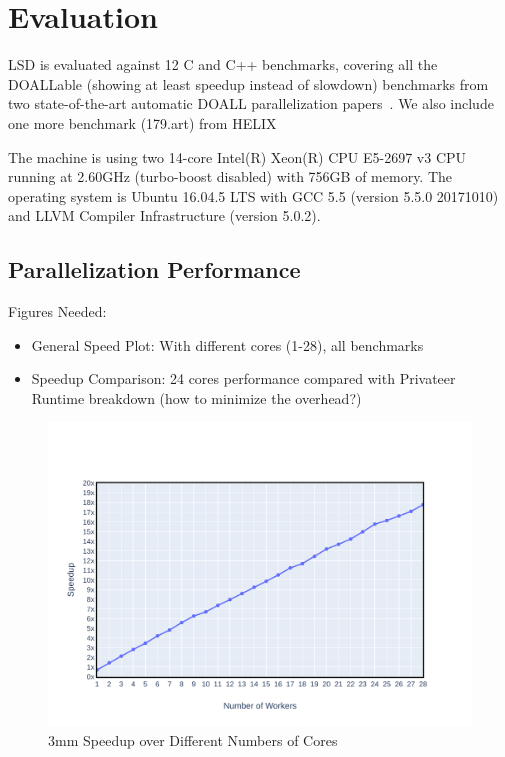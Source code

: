 \section{Evaluation}

LSD is evaluated against 12 C and C++ benchmarks, covering all the DOALLable
(showing at least speedup instead of slowdown) benchmarks from two
state-of-the-art automatic DOALL parallelization
papers~\cite{johnson:12:pldi,kim:12:cgo}. We also include one more benchmark
(179.art) from HELIX


The machine is using two 14-core Intel(R) Xeon(R)
CPU E5-2697 v3 CPU running at 2.60GHz (turbo-boost disabled) with 756GB of
memory. The operating system is Ubuntu 16.04.5 LTS with GCC 5.5 (version 5.5.0
20171010) and LLVM Compiler
Infrastructure (version 5.0.2).


\subsection{Parallelization Performance}
Figures Needed:
\begin{itemize}
\item General Speed Plot: With different cores (1-28), all benchmarks
\item Speedup Comparison: 24 cores performance compared with Privateer
Runtime breakdown (how to minimize the overhead?)

\end{itemize}

\begin{figure}[htp]
  \includegraphics[width=\textwidth]{figures/3mm-scale-crop}
  \caption{3mm Speedup over Different Numbers of Cores}
  \label{fig:3mm-scale}
\end{figure}

